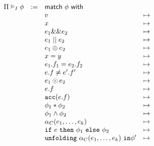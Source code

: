 \begin{align*}
\begin{array}{rclcl}
\Pi \vDash_I \phi &:=& \textsf{match} \ \phi \ \textsf{with} &&
\\
&& v &\mapsto&
\\
&& x &\mapsto&
\\
&& e_1 \&\& e_2 &\mapsto&
\\
&& e_1 \mid\mid e_2 &\mapsto&
\\
&& e_1 \oplus e_2 &\mapsto&
\\
&& x = y &\mapsto&
\\
&& e_1.f_1 = e_2.f_2 &\mapsto&
\\
&& e.f \neq e^\prime.f^\prime &\mapsto&
\\
&& e_1 \odot e_2 &\mapsto&
\\
&& e.f &\mapsto&
\\
&& \texttt{acc}(e.f) &\mapsto&
\\
&& \phi_1 \ast \phi_2 &\mapsto&
\\
&& \phi_1 \land \phi_2 &\mapsto&
\\
&& \alpha_C(e_1, \dots, e_k) &\mapsto&
\\
&& \texttt{if} \ e \ \texttt{then} \ \phi_1 \ \texttt{else} \ \phi_2 &\mapsto&
\\
&& \texttt{unfolding} \ \alpha_C(e_1, \dots, e_k) \ \texttt{in} \phi^\prime &\mapsto&
\\
\end{array}
\end{align*}
